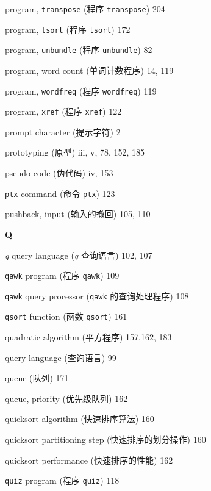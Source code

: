 \begin{multicols}{2}
\hangindent=2pc  program, \verb'transpose' (程序
\verb'transpose') 204

\hangindent=2pc  program, \verb'tsort' (程序 \verb'tsort') 172

\hangindent=2pc  program, \verb'unbundle' (程序
\verb'unbundle') 82

\hangindent=2pc  program, word count (单词计数程序) 14, 119

\hangindent=2pc  program, \verb'wordfreq' (程序
\verb'wordfreq') 119

\hangindent=2pc  program, \verb'xref' (程序 \verb'xref') 122

\hangindent=2pc  prompt character (提示字符) 2

\hangindent=2pc  prototyping (原型) iii, v, 78, 152, 185

\hangindent=2pc  pseudo-code (伪代码) iv, 153

\hangindent=2pc  \verb'ptx' command (命令 \verb'ptx') 123

\hangindent=2pc  pushback, input (输入的撤回) 105, 110

\medskip\textbf{\large{Q}}

\hangindent=2pc  \textit{q} query language (\textit{q}
查询语言) 102, 107

\hangindent=2pc  \verb'qawk' program (程序 \verb'qawk') 109

\hangindent=2pc  \verb'qawk' query processor (\verb'qawk'
的查询处理程序) 108

\hangindent=2pc  \verb'qsort' function (函数 \verb'qsort') 161

\hangindent=2pc  quadratic algorithm (平方程序) 157,162, 183

\hangindent=2pc  query language (查询语言) 99

\hangindent=2pc  queue (队列) 171

\hangindent=2pc  queue, priority (优先级队列) 162

\hangindent=2pc  quicksort algorithm (快速排序算法) 160

\hangindent=2pc  quicksort partitioning step
(快速排序的划分操作) 160

\hangindent=2pc  quicksort performance (快速排序的性能) 162

\hangindent=2pc  \verb'quiz' program (程序 \verb'quiz') 118


\end{multicols}
